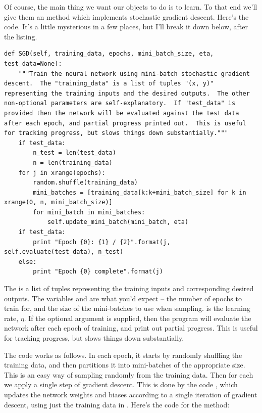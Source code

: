 \documentclass[a4paper,twoside,10pt]{book}
\begin{document}
Of course, the main thing we want our  objects to do is to learn. To that end we'll give them an  method which implements stochastic gradient descent. Here's the code. It's a little mysterious in a few places, but I'll break it down below, after the listing.
\begin{lstlisting}
def SGD(self, training_data, epochs, mini_batch_size, eta, test_data=None):
	"""Train the neural network using mini-batch stochastic gradient descent.  The "training_data" is a list of tuples "(x, y)" representing the training inputs and the desired outputs.  The other non-optional parameters are self-explanatory.  If "test_data" is provided then the network will be evaluated against the test data after each epoch, and partial progress printed out.  This is useful for tracking progress, but slows things down substantially."""
	if test_data:
		n_test = len(test_data)
		n = len(training_data)
	for j in xrange(epochs):
		random.shuffle(training_data)
		mini_batches = [training_data[k:k+mini_batch_size] for k in xrange(0, n, mini_batch_size)]
		for mini_batch in mini_batches:
			self.update_mini_batch(mini_batch, eta)
	if test_data:
		print "Epoch {0}: {1} / {2}".format(j, self.evaluate(test_data), n_test)
	else:
		print "Epoch {0} complete".format(j)
\end{lstlisting}
The  is a list of tuples  representing the training inputs and corresponding desired outputs. The variables  and    are what you'd expect -- the number of epochs to train for, and the size of the mini-batches to use when sampling.  is the learning rate, $\eta$. If the optional argument  is supplied, then the program will evaluate the network after each epoch of training, and print out partial progress. This is useful for tracking progress, but slows things down substantially.

The code works as follows. In each epoch, it starts by randomly shuffling the training data, and then partitions it into mini-batches of the appropriate size. This is an easy way of sampling randomly from the training data. Then for each  we apply a single step of gradient descent. This is done by the code , which updates the network weights and biases according to a single iteration of gradient descent, using just the training data in . Here's the code for the  method:
\end{document}
